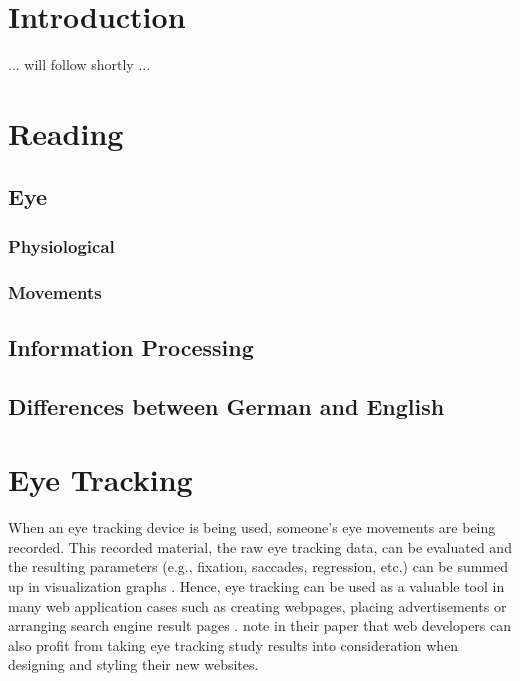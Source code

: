 \section{Introduction}
\label{section:Introduction}
... will follow shortly ...

\section{Reading}
\label{section:Reading}

\subsection{Eye}
\label{subsection:Eye}

\subsubsection{Physiological}

\subsubsection{Movements}

\subsection{Information Processing}
\label{subsection:InformationProcessing}

\subsection{Differences between German and English}
\label{subsection:Differences}

\section{Eye Tracking}
\label{section:EyeTracking}
When an eye tracking device is being used, someone's eye movements are being recorded. This recorded material, the raw eye tracking data, can be evaluated and the resulting parameters (e.g., fixation, saccades, regression, etc.) can be summed up in visualization graphs \autocite[]{goldberg2002eye, poole2006eye, beymer2007eye}. Hence, eye tracking can be used as a valuable tool in many web application cases such as creating webpages, placing advertisements or arranging search engine result pages \autocite{buscher2009you, liu2015influence}. \textcite[]{buscher2009you} note in their paper that web developers can also profit from taking eye tracking study results into consideration when designing and styling their new websites. 

